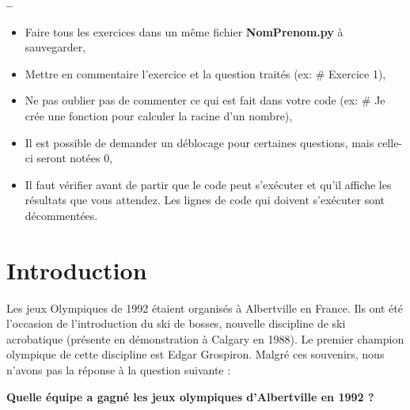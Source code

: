 


\usepackage{enumitem}







\begin{center}
{\Large\bf {\type} \no {\numero} -- \descrip}
\end{center}


\begin{boxedminipage}{.9\textwidth} 
\begin{itemize}
 \item Faire tous les exercices dans un même fichier \textbf{NomPrenom.py} à sauvegarder,
 \item Mettre en commentaire l'exercice et la question traités (ex: \# Exercice 1),
 \item Ne pas oublier pas de commenter ce qui est fait dans votre code (ex: \# Je crée une fonction pour calculer la racine d'un nombre),
 \item Il est possible de demander un déblocage pour certaines questions, mais celle-ci seront notées 0,
 \item Il faut vérifier avant de partir que le code peut s'exécuter et qu'il affiche les résultats que vous attendez. Les lignes de code qui doivent s'exécuter sont décommentées.
\end{itemize}
\end{boxedminipage}

\section*{Introduction}

Les jeux Olympiques de 1992 étaient organisés à Albertville en France. Ils ont été l'occasion de l'introduction du ski de bosses, nouvelle discipline de ski acrobatique (présente en démonstration à Calgary en 1988). Le premier champion olympique de cette discipline est Edgar Grospiron. Malgré ces souvenirs, nous n'avons pas la réponse à la question suivante :

\begin{center}
\Large{\textbf{Quelle équipe a gagné les jeux olympiques d'Albertville en 1992 ?}}
\end{center}

